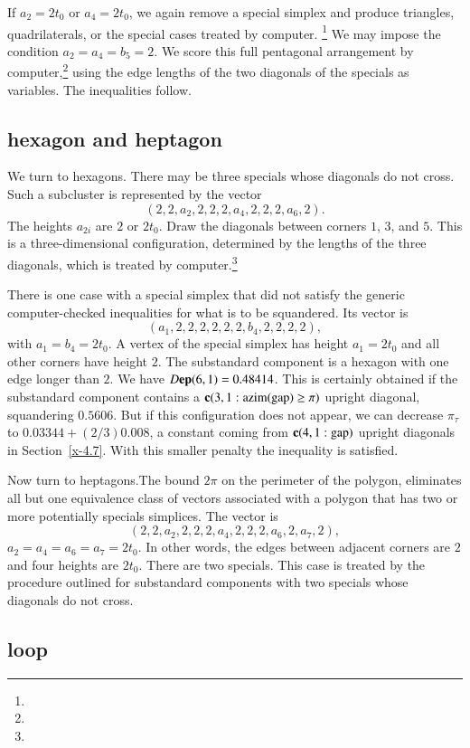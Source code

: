 If $a_2=2t_0$ or $a_4=2t_0$, we again remove a special simplex and
produce triangles, quadrilaterals, or the special cases treated
by computer.%
\footnote{} %
We may impose the condition $a_2=a_4=b_5=2$. We score this full pentagonal
arrangement by computer,\footnote{} %
using the edge lengths of the two diagonals of
the specials as variables. The inequalities follow.

\subsection{hexagon and heptagon} %

We turn to hexagons. There may be three specials whose diagonals do not
cross.  Such a subcluster is represented by the vector
    $$(2,2,a_2,2,2,2,a_4,2,2,2,a_6,2).$$
The heights $a_{2i}$ are $2$ or $2t_0$.  Draw the diagonals between
corners $1$, $3$, and $5$.  This is a three-dimensional configuration,
determined by the lengths of the three diagonals, which is treated
by computer.\footnote{} %

There is one case with a special simplex that
did not satisfy the generic computer-checked inequalities for
what is to be squandered.  Its vector is
    $$(a_1,2,2,2,2,2,2,b_4,2,2,2,2),$$
with $a_1=b_4=2t_0$. A vertex of the special simplex has height
$a_1=2t_0$ and all other corners have height $2$.  The substandard component
is a hexagon with one edge longer than $2$.  We have $D{\operatorname{\bf ep}}{(6,1)}=
0.48414$. This is certainly obtained if the substandard component contains a
${\operatorname{\bf c}}{(3,1: {\operatorname{azim}}({\operatorname{gap}}) \ge \pi)}$ upright diagonal, squandering $0.5606$. But if this
configuration does not appear, we can decrease $\pi_\tau$ to
    $0.03344 + (2/3) 0.008$,
a constant coming from ${\operatorname{\bf c}}{(4,1:{\operatorname{gap}})}$ upright diagonals in
Section~\ref{x-4.7}. With this smaller penalty the inequality is
satisfied.

Now turn to heptagons.The bound $2\pi$  on the perimeter of the polygon,
eliminates all but one equivalence class of vectors associated with a
polygon that has two or more potentially specials simplices. The vector
is
    $$(2,2,a_2,2,2,2,a_4,2,2,2,a_6,2,a_7,2),$$
$a_2=a_4=a_6=a_7=2t_0$. In other words, the edges between adjacent
corners are $2$ and four heights are $2t_0$. There are two specials.
This case is treated by the procedure outlined for substandard components with two
specials whose diagonals do not cross.

\subsection{loop} %
    \label{sec:loops}

